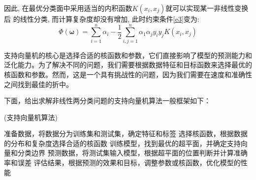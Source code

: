 因此, 在最优分类面中采用适当的内积函数$K(x_i,x_j)$就可以实现某一非线性变换后 的线性分类, 而计算复杂度却没有增加\cite{张学工2000关于统计学习理论与支持向量机}, 此时约束条件\ref{e3}变为:
\begin{equation}
\Phi(\boldsymbol{\omega})=\sum_{i=1}^n \alpha_i-\frac{1}{2} \sum_{i, j=1}^n \alpha_1 \alpha_j y_i y_j K\left(x_i, x_j\right)
\end{equation}


{\hei 支持向量机的核心是选择合适的核函数和参数，它们直接影响了模型的预测能力和泛化能力。为了解决不同的问题，我们需要根据数据特征和目标函数来选择最优的核函数和参数。然而，这是一个具有挑战性的问题，因为我们需要在速度和准确性之间找到最佳的折中。}

下面，给出求解非线性两分类问题的支持向量机算法一般框架如下：

\begin{algorithm}[H]	
	\caption{(支持向量机算法)}
	\renewcommand{\algorithmicrequire}{\textbf{输入:}} 
	\renewcommand{\algorithmicensure}{\textbf{输出:}}
	
	\begin{algorithmic}[1]
		\State  准备数据，将数据分为训练集和测试集，确定特征和标签
		\State 选择核函数，根据数据的分布和复杂度选择合适的核函数
		\State  训练模型，找到最优的超平面，并确定支持向量和分类边界
		\State  预测数据，将测试集输入模型，根据超平面的位置判断并计算准确率和误差
		\State  评估结果，根据预测的效果和目标，调整参数或核函数，优化模型的性能
	\end{algorithmic}
\end{algorithm}	

